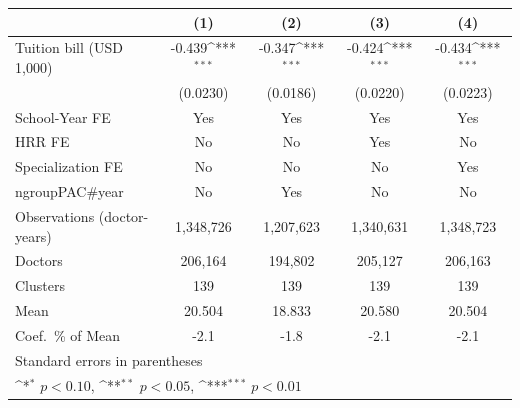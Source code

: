 {
\def\sym#1{\ifmmode^{#1}\else\(^{#1}\)\fi}
\begin{tabular}{l*{4}{c}}
\hline\hline
                    &\multicolumn{1}{c}{(1)}         &\multicolumn{1}{c}{(2)}         &\multicolumn{1}{c}{(3)}         &\multicolumn{1}{c}{(4)}         \\
\hline
Tuition bill (USD 1,000)&      -0.439\sym{***}&      -0.347\sym{***}&      -0.424\sym{***}&      -0.434\sym{***}\\
                    &    (0.0230)         &    (0.0186)         &    (0.0220)         &    (0.0223)         \\
[1em]
School-Year FE      &         Yes         &         Yes         &         Yes         &         Yes         \\
[1em]
HRR FE              &          No         &          No         &         Yes         &          No         \\
[1em]
Specialization FE   &          No         &          No         &          No         &         Yes         \\
[1em]
ngroupPAC#year      &          No         &         Yes         &          No         &          No         \\
\hline
Observations (doctor-years)&   1,348,726         &   1,207,623         &   1,340,631         &   1,348,723         \\
Doctors             &     206,164         &     194,802         &     205,127         &     206,163         \\
Clusters            &         139         &         139         &         139         &         139         \\
Mean                &      20.504         &      18.833         &      20.580         &      20.504         \\
Coef.\ \% of Mean   &        -2.1         &        -1.8         &        -2.1         &        -2.1         \\
\hline\hline
\multicolumn{5}{l}{\footnotesize Standard errors in parentheses}\\
\multicolumn{5}{l}{\footnotesize \sym{*} \(p<0.10\), \sym{**} \(p<0.05\), \sym{***} \(p<0.01\)}\\
\end{tabular}
}
